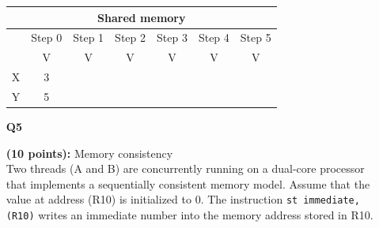 \documentclass[a4paper,10pt]{article}
\begin{document}
\begin{enumerate}
{        \begin{table}[!hbpt]
        \centering
        \begin{tabular}{|ccccccc|}
        \hline
        \multicolumn{7}{|c|}{Shared memory}                                                                                                                                                                                                                            \\ \hline
        \multicolumn{1}{|c|}{}  & \multicolumn{1}{c|}{Step 0} & \multicolumn{1}{c|}{\cellcolor[HTML]{C0C0C0}Step 1} & \multicolumn{1}{c|}{Step 2} & \multicolumn{1}{c|}{\cellcolor[HTML]{C0C0C0}Step 3} & \multicolumn{1}{c|}{Step 4} & \cellcolor[HTML]{C0C0C0}Step 5 \\ \hline
        \multicolumn{1}{|c|}{}  & \multicolumn{1}{c|}{V}      & \multicolumn{1}{c|}{\cellcolor[HTML]{C0C0C0}V}      & \multicolumn{1}{c|}{V}      & \multicolumn{1}{c|}{\cellcolor[HTML]{C0C0C0}V}      & \multicolumn{1}{c|}{V}      & \cellcolor[HTML]{C0C0C0}V      \\ \hline
        \multicolumn{1}{|c|}{X} & \multicolumn{1}{c|}{3}      & \multicolumn{1}{c|}{\cellcolor[HTML]{C0C0C0}}       & \multicolumn{1}{c|}{}       & \multicolumn{1}{c|}{\cellcolor[HTML]{C0C0C0}}       & \multicolumn{1}{c|}{}       & \cellcolor[HTML]{C0C0C0}       \\ \hline
        \multicolumn{1}{|c|}{Y} & \multicolumn{1}{c|}{5}      & \multicolumn{1}{c|}{\cellcolor[HTML]{C0C0C0}}       & \multicolumn{1}{c|}{}       & \multicolumn{1}{c|}{\cellcolor[HTML]{C0C0C0}}       & \multicolumn{1}{c|}{}       & \cellcolor[HTML]{C0C0C0}       \\ \hline
        \end{tabular}
        \end{table}
        
        \pagebreak
    }
    \item[\textbf{Q5}]{\textbf{(10 points):} Memory consistency \\ 
    
        Two threads (A and B) are concurrently running on a dual-core processor that 
        implements a sequentially consistent memory model. Assume that the value at address 
        (R10) is initialized to 0. The instruction \texttt{st immediate, (R10)} writes an immediate 
        number into the memory address stored in R10.
        
}
\end{enumerate}
\end{document}
